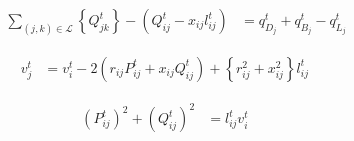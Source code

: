 \documentclass[../../outputs/main.tex]{subfiles}
\begin{document}
\vspace{-2.0em} %

\begin{align}
    {\sum_{(j, k) \in \mathcal{L}} \left\{Q_{jk}^t\right\}  
    - \left(Q_{ij}^t - x_{ij}l_{ij}^t\right)} &= {q_{D_j}^t + q_{B_j}^t - q^t_{L_j}}
    \label{eq:ReactivePowerBalanceNodej}
\end{align}

\vspace{-1.5em} %

\begin{align}
    {v_j^t} &= {v_{i}^t - 2(r_{ij}P_{ij}^t + x_{ij}Q_{ij}^t) + \left\{r_{ij}^2 + x_{ij}^2\right\}l_{ij}^t}  
    \label{eq:KVL-branch-ij} &&
\end{align}



\vspace{-1.5em} %

\begin{align}
    {(P_{ij}^{t})^2 + (Q_{ij}^{t})^2} &= {l_{ij}^t v_i^t} 
    \label{eq:ApparentPowerEquationBFM} &&
\end{align}

\vspace{-2.0em} %
\end{document}

